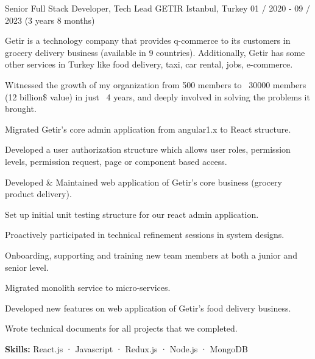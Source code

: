 \begin{cventries}
  \cventry
    {Senior Full Stack Developer, Tech Lead} %
    {GETIR} %
    {Istanbul, Turkey} %
    {01 / 2020 - 09 / 2023 (3 years 8 months)}
    {
      \begin{cvitems} %
        \item {Getir is a technology company that provides q-commerce to its customers in grocery delivery business (available in 9 countries). Additionally, Getir has some other services in Turkey like food delivery, taxi, car rental, jobs, e-commerce.}
        \item {Witnessed the growth of my organization from 500 members to ~30000 members (12 billion{\$} value) in just ~4 years, and deeply involved in solving the problems it brought.}
        \item {Migrated Getir's core admin application from angular1.x to React structure.}
        \item {Developed a user authorization structure which allows user roles, permission levels, permission request, page or component based access.}
        \item {Developed {\&} Maintained web application of Getir's core business (grocery product delivery).}
        \item {Set up initial unit testing structure for our react admin application.}
        \item {Proactively participated in technical refinement sessions in system designs.}
        \item {Onboarding, supporting and training new team members at both a junior and senior level.}
        \item {Migrated monolith service to micro-services.}
        \item {Developed new features on web application of Getir's food delivery business.}
        \item {Wrote technical documents for all projects that we completed.}
        \item {\textbf {Skills:} React.js · Javascript · Redux.js · Node.js · MongoDB}
      \end{cvitems}
    }


\end{cventries}
